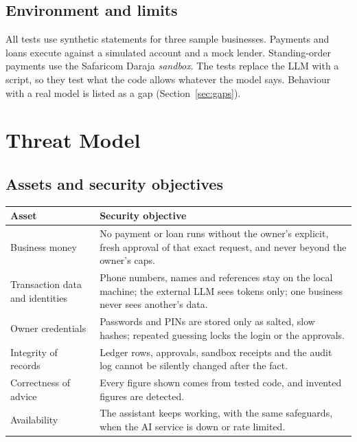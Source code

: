 \documentclass[10pt,a4paper]{article}
\begin{document}
\subsection{Environment and limits}
All tests use synthetic statements for three sample businesses. Payments and loans execute against a simulated account and a mock lender. Standing-order payments use the Safaricom Daraja \emph{sandbox}. The tests replace the LLM with a script, so they test what the code allows whatever the model says. Behaviour with a real model is listed as a gap (Section~\ref{sec:gaps}).

\section{Threat Model}
\label{sec:threat}

\subsection{Assets and security objectives}
\begin{center}
\begin{tabularx}{\textwidth}{@{}L{3.6cm}Y@{}}
\toprule
\textbf{Asset} & \textbf{Security objective}\\
\midrule
Business money & No payment or loan runs without the owner's explicit, fresh approval of that exact request, and never beyond the owner's caps.\\
Transaction data and identities & Phone numbers, names and references stay on the local machine; the external LLM sees tokens only; one business never sees another's data.\\
Owner credentials & Passwords and PINs are stored only as salted, slow hashes; repeated guessing locks the login or the approvals.\\
Integrity of records & Ledger rows, approvals, sandbox receipts and the audit log cannot be silently changed after the fact.\\
Correctness of advice & Every figure shown comes from tested code, and invented figures are detected.\\
Availability & The assistant keeps working, with the same safeguards, when the AI service is down or rate limited.\\
\bottomrule
\end{tabularx}
\end{center}
\end{document}
